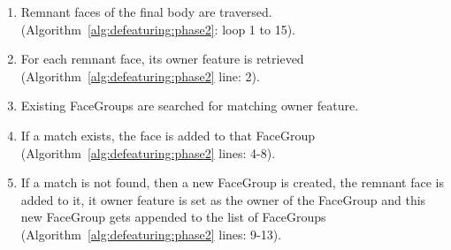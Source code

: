 \begin{enumerate}
[noitemsep,topsep=2pt,parsep=2pt,partopsep=2pt]
\item Remnant faces of the final body are traversed. (Algorithm~\ref{alg:defeaturing:phase2}: loop 1 to 15).  
\item For each remnant face, its owner feature is retrieved (Algorithm~\ref{alg:defeaturing:phase2} line: 2).
\item Existing FaceGroups are searched for matching owner feature.
\item If a match exists, the face is added to that FaceGroup  (Algorithm~\ref{alg:defeaturing:phase2} lines: 4-8).
\item If a match is not found, then a new FaceGroup is created, the remnant face is added to it, it owner feature is set as the owner of the FaceGroup and this new FaceGroup gets appended to the list of FaceGroups  (Algorithm~\ref{alg:defeaturing:phase2} lines: 9-13).

\bigskip

\begin{minipage}{\linewidth}


\end{minipage}
\end{enumerate}
